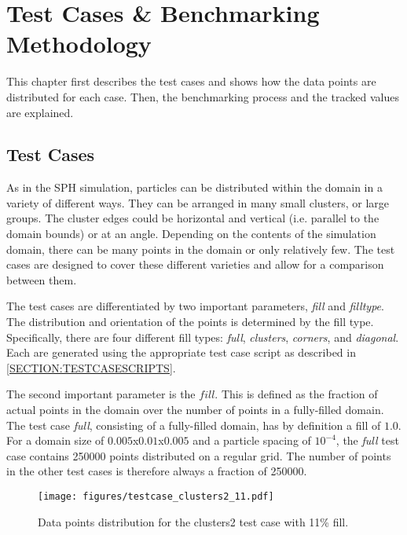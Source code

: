 
\chapter{Test Cases \& Benchmarking Methodology}
\label{CHAPTER:BENCHMARKING}

This chapter first describes the test cases and shows how the data points are distributed for each case. Then, the benchmarking process and the tracked values are explained.

\section{Test Cases}
\label{SECTION:TESTCASES}

As in the SPH simulation, particles can be distributed within the domain in a variety of different ways. They can be arranged in many small clusters, or large groups. The cluster edges could be horizontal and vertical (i.e. parallel to the domain bounds) or at an angle. Depending on the contents of the simulation domain, there can be many points in the domain or only relatively few. The test cases are designed to cover these different varieties and allow for a comparison between them.

The test cases are differentiated by two important parameters, {\itshape fill} and {\itshape filltype}. The distribution and orientation of the points is determined by the fill type. Specifically, there are four different fill types: {\itshape full}, {\itshape clusters}, {\itshape corners}, and {\itshape diagonal}. Each are generated using the appropriate test case script as described in \ref{SECTION:TESTCASESCRIPTS}.

The second important parameter is the $fill$. This is defined as the fraction of actual points in the domain over the number of points in a fully-filled domain. The test case {\itshape full}, consisting of a fully-filled domain, has by definition a fill of $1.0$. For a domain size of $0.005$x$0.01$x$0.005$ and a particle spacing of $10^{-4}$, the {\itshape full} test case contains 250000 points distributed on a regular grid. The number of points in the other test cases is therefore always a fraction of 250000. 

\begin{figure}[h]
	\centering
	\texttt{[image: figures/testcase\_clusters2\_11.pdf]}
	\caption{Data points distribution for the clusters2 test case with 11\% fill.}
	\label{FIG:clusters2_11}
\end{figure}

